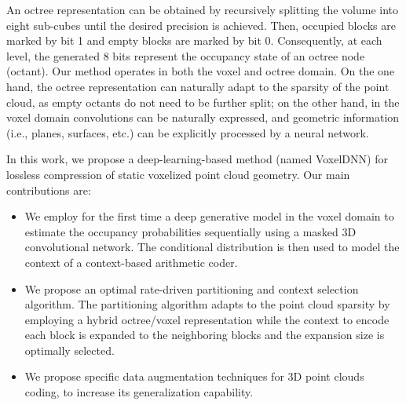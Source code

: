 An octree representation can be obtained by %
recursively splitting the volume into eight sub-cubes until the desired precision is achieved. Then, occupied blocks are marked by bit 1 and empty blocks are marked by bit 0. Consequently, at each level, the generated 8 bits represent the occupancy state of an octree node (octant). Our method operates in both the voxel and octree domain. On the one hand, the octree representation can naturally adapt to the  sparsity of the point cloud, as empty octants do not need to be further split; on the other hand, in the voxel domain convolutions can be naturally expressed, and geometric information (i.e., planes, surfaces, etc.) can be explicitly processed by a neural network. 

In this work, we propose a deep-learning-based method (named VoxelDNN) for lossless compression of static voxelized point cloud geometry. Our main contributions are:
\begin{itemize}
    \item We employ for the first time a deep generative model in the voxel domain to estimate the occupancy probabilities sequentially using a masked 3D convolutional network. The conditional distribution is then used to model the context of a context-based arithmetic coder.
    \item We propose an optimal rate-driven partitioning and context selection algorithm. The partitioning algorithm adapts to the point cloud sparsity by employing a hybrid octree/voxel representation while the context to encode each block is expanded to the neighboring blocks and the expansion size is optimally selected.
    \item  We propose specific data augmentation techniques for 3D point clouds coding, to increase its generalization capability.
\end{itemize}
     
